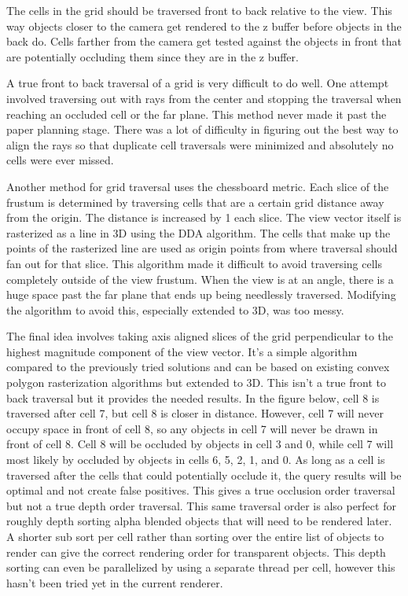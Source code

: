\documentclass[12pt]{ucthesis}
\begin{document}
The cells in the grid should be traversed front to back relative to the view.
This way objects closer to the camera get rendered to the z buffer before objects in the back do.
Cells farther from the camera get tested against the objects in front that are potentially occluding them since they are in the z buffer.

A true front to back traversal of a grid is very difficult to do well.
One attempt involved traversing out with rays from the center and stopping the traversal when reaching an occluded cell or the far plane.
This method never made it past the paper planning stage.
There was a lot of difficulty in figuring out the best way to align the rays so that duplicate cell traversals were minimized and absolutely no cells were ever missed.

Another method for grid traversal uses the chessboard metric. %
Each slice of the frustum is determined by traversing cells that are a certain grid distance away from the origin.
The distance is increased by 1 each slice.
The view vector itself is rasterized as a line in 3D using the DDA algorithm.
The cells that make up the points of the rasterized line are used as origin points from where traversal should fan out for that slice.
This algorithm made it difficult to avoid traversing cells completely outside of the view frustum.
When the view is at an angle, there is a huge space past the far plane that ends up being needlessly traversed.
Modifying the algorithm to avoid this, especially extended to 3D, was too messy.

The final idea involves taking axis aligned slices of the grid perpendicular to the highest magnitude component of the view vector.
It's a simple algorithm compared to the previously tried solutions and can be based on existing convex polygon rasterization algorithms but extended to 3D.
This isn't a true front to back traversal but it provides the needed results.
In the figure below, cell 8 is traversed after cell 7, but cell 8 is closer in distance.
However, cell 7 will never occupy space in front of cell 8, so any objects in cell 7 will never be drawn in front of cell 8.
Cell 8 will be occluded by objects in cell 3 and 0, while cell 7 will most likely by occluded by objects in cells 6, 5, 2, 1, and 0.
As long as a cell is traversed after the cells that could potentially occlude it, the query results will be optimal and not create false positives.
This gives a true occlusion order traversal but not a true depth order traversal.
This same traversal order is also perfect for roughly depth sorting alpha blended objects that will need to be rendered later.
A shorter sub sort per cell rather than sorting over the entire list of objects to render can give the correct rendering order for transparent objects.
This depth sorting can even be parallelized by using a separate thread per cell, however this hasn't been tried yet in the current renderer.
\end{document}
